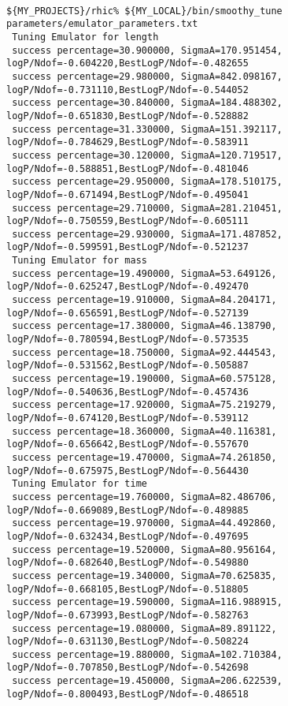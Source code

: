 \documentclass[UserManual.tex]{subfiles}
\begin{document}
{\tt
\begin{verbatim}
${MY_PROJECTS}/rhic% ${MY_LOCAL}/bin/smoothy_tune parameters/emulator_parameters.txt
 Tuning Emulator for length
 success percentage=30.900000, SigmaA=170.951454, logP/Ndof=-0.604220,BestLogP/Ndof=-0.482655
 success percentage=29.980000, SigmaA=842.098167, logP/Ndof=-0.731110,BestLogP/Ndof=-0.544052
 success percentage=30.840000, SigmaA=184.488302, logP/Ndof=-0.651830,BestLogP/Ndof=-0.528882
 success percentage=31.330000, SigmaA=151.392117, logP/Ndof=-0.784629,BestLogP/Ndof=-0.583911
 success percentage=30.120000, SigmaA=120.719517, logP/Ndof=-0.588851,BestLogP/Ndof=-0.481046
 success percentage=29.950000, SigmaA=178.510175, logP/Ndof=-0.671494,BestLogP/Ndof=-0.495041
 success percentage=29.710000, SigmaA=281.210451, logP/Ndof=-0.750559,BestLogP/Ndof=-0.605111
 success percentage=29.930000, SigmaA=171.487852, logP/Ndof=-0.599591,BestLogP/Ndof=-0.521237
 Tuning Emulator for mass
 success percentage=19.490000, SigmaA=53.649126, logP/Ndof=-0.625247,BestLogP/Ndof=-0.492470
 success percentage=19.910000, SigmaA=84.204171, logP/Ndof=-0.656591,BestLogP/Ndof=-0.527139
 success percentage=17.380000, SigmaA=46.138790, logP/Ndof=-0.780594,BestLogP/Ndof=-0.573535
 success percentage=18.750000, SigmaA=92.444543, logP/Ndof=-0.531562,BestLogP/Ndof=-0.505887
 success percentage=19.190000, SigmaA=60.575128, logP/Ndof=-0.540636,BestLogP/Ndof=-0.457436
 success percentage=17.920000, SigmaA=75.219279, logP/Ndof=-0.674120,BestLogP/Ndof=-0.539112
 success percentage=18.360000, SigmaA=40.116381, logP/Ndof=-0.656642,BestLogP/Ndof=-0.557670
 success percentage=19.470000, SigmaA=74.261850, logP/Ndof=-0.675975,BestLogP/Ndof=-0.564430
 Tuning Emulator for time
 success percentage=19.760000, SigmaA=82.486706, logP/Ndof=-0.669089,BestLogP/Ndof=-0.489885
 success percentage=19.970000, SigmaA=44.492860, logP/Ndof=-0.632434,BestLogP/Ndof=-0.497695
 success percentage=19.520000, SigmaA=80.956164, logP/Ndof=-0.682640,BestLogP/Ndof=-0.549880
 success percentage=19.340000, SigmaA=70.625835, logP/Ndof=-0.668105,BestLogP/Ndof=-0.518805
 success percentage=19.590000, SigmaA=116.988915, logP/Ndof=-0.673993,BestLogP/Ndof=-0.582763
 success percentage=19.080000, SigmaA=89.891122, logP/Ndof=-0.631130,BestLogP/Ndof=-0.508224
 success percentage=19.880000, SigmaA=102.710384, logP/Ndof=-0.707850,BestLogP/Ndof=-0.542698
 success percentage=19.450000, SigmaA=206.622539, logP/Ndof=-0.800493,BestLogP/Ndof=-0.486518
\end{verbatim}
}
\end{document}

